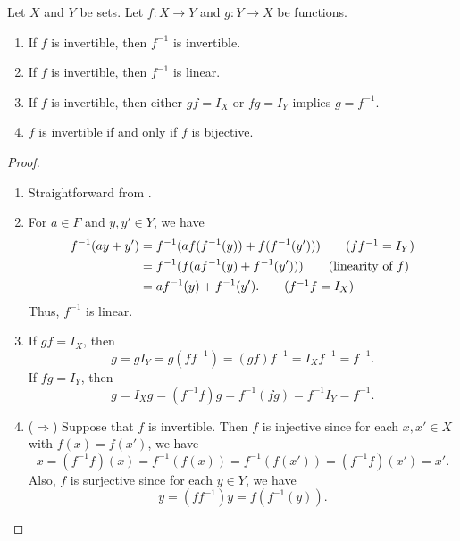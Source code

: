 \begin{proposition}
  \label{prop:inverse}
  Let $X$ and $Y$ be sets.
  Let $f: X \to Y$ and $g: Y \to X$ be functions.
  \begin{enumerate}
    \item If $f$ is invertible, then $f^{-1}$ is invertible.
    \item If $f$ is invertible, then $f^{-1}$ is linear.
    \item If $f$ is invertible, then either $gf = I_X$ or $fg = I_Y$ implies
    $g = f^{-1}$.
    \item $f$ is invertible if and only if $f$ is bijective.
  \end{enumerate}
\end{proposition}
\begin{proof}
  \leavevmode
  \begin{enumerate}
    \item Straightforward from .
    
    \item For $a \in F$ and $y, y' \in Y$, we have
    \begin{align*}
      f^{-1}(ay + y')
      &= f^{-1}(af(f^{-1}(y)) + f(f^{-1}(y'))) \tag{$ff^{-1} = I_Y$} \\
      &= f^{-1}(f(af^{-1}(y) + f^{-1}(y'))) \tag{linearity of $f$} \\
      &= af^{-1}(y) + f^{-1}(y'). \tag{$f^{-1}f = I_X$}
    \end{align*}
    Thus, $f^{-1}$ is linear.
    
    \item
    If $gf = I_X$, then
    \begin{equation*}
      g = gI_Y = g(ff^{-1}) = (gf)f^{-1} = I_Xf^{-1} = f^{-1}.
    \end{equation*}
    If $fg = I_Y$, then
    \begin{equation*}
      g = I_Xg = (f^{-1}f)g = f^{-1}(fg) = f^{-1}I_Y = f^{-1}.
    \end{equation*}
    
    \item
    ($\Rightarrow$)
    Suppose that $f$ is invertible.
    Then $f$ is injective since for each $x, x' \in X$ with $f(x) = f(x')$,
    we have
    \begin{equation*}
      x = (f^{-1}f)(x) = f^{-1}(f(x)) = f^{-1}(f(x')) = (f^{-1}f)(x') = x'.
    \end{equation*}
    Also, $f$ is surjective since for each $y \in Y$, we have
    \begin{equation*}
      y = (ff^{-1})y = f(f^{-1}(y)).
    \end{equation*}


\end{enumerate}
\end{proof}
